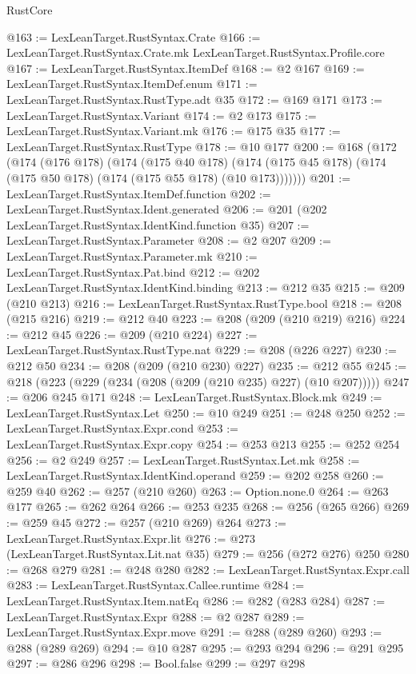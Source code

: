 \begin{lexlean}{RustCore}
\begin{coremodule}
@163 := LexLeanTarget.RustSyntax.Crate
@166 := LexLeanTarget.RustSyntax.Crate.mk LexLeanTarget.RustSyntax.Profile.core
@167 := LexLeanTarget.RustSyntax.ItemDef
@168 := @2 @167
@169 := LexLeanTarget.RustSyntax.ItemDef.enum
@171 := LexLeanTarget.RustSyntax.RustType.adt @35
@172 := @169 @171
@173 := LexLeanTarget.RustSyntax.Variant
@174 := @2 @173
@175 := LexLeanTarget.RustSyntax.Variant.mk
@176 := @175 @35
@177 := LexLeanTarget.RustSyntax.RustType
@178 := @10 @177
@200 := @168
    (@172
      (@174
        (@176 @178)
        (@174
          (@175 @40 @178)
          (@174 (@175 @45 @178) (@174 (@175 @50 @178) (@174 (@175 @55 @178) (@10 @173)))))))
@201 := LexLeanTarget.RustSyntax.ItemDef.function
@202 := LexLeanTarget.RustSyntax.Ident.generated
@206 := @201 (@202 LexLeanTarget.RustSyntax.IdentKind.function @35)
@207 := LexLeanTarget.RustSyntax.Parameter
@208 := @2 @207
@209 := LexLeanTarget.RustSyntax.Parameter.mk
@210 := LexLeanTarget.RustSyntax.Pat.bind
@212 := @202 LexLeanTarget.RustSyntax.IdentKind.binding
@213 := @212 @35
@215 := @209 (@210 @213)
@216 := LexLeanTarget.RustSyntax.RustType.bool
@218 := @208 (@215 @216)
@219 := @212 @40
@223 := @208 (@209 (@210 @219) @216)
@224 := @212 @45
@226 := @209 (@210 @224)
@227 := LexLeanTarget.RustSyntax.RustType.nat
@229 := @208 (@226 @227)
@230 := @212 @50
@234 := @208 (@209 (@210 @230) @227)
@235 := @212 @55
@245 := @218 (@223 (@229 (@234 (@208 (@209 (@210 @235) @227) (@10 @207)))))
@247 := @206 @245 @171
@248 := LexLeanTarget.RustSyntax.Block.mk
@249 := LexLeanTarget.RustSyntax.Let
@250 := @10 @249
@251 := @248 @250
@252 := LexLeanTarget.RustSyntax.Expr.cond
@253 := LexLeanTarget.RustSyntax.Expr.copy
@254 := @253 @213
@255 := @252 @254
@256 := @2 @249
@257 := LexLeanTarget.RustSyntax.Let.mk
@258 := LexLeanTarget.RustSyntax.IdentKind.operand
@259 := @202 @258
@260 := @259 @40
@262 := @257 (@210 @260)
@263 := Option.none.{0}
@264 := @263 @177
@265 := @262 @264
@266 := @253 @235
@268 := @256 (@265 @266)
@269 := @259 @45
@272 := @257 (@210 @269) @264
@273 := LexLeanTarget.RustSyntax.Expr.lit
@276 := @273 (LexLeanTarget.RustSyntax.Lit.nat @35)
@279 := @256 (@272 @276) @250
@280 := @268 @279
@281 := @248 @280
@282 := LexLeanTarget.RustSyntax.Expr.call
@283 := LexLeanTarget.RustSyntax.Callee.runtime
@284 := LexLeanTarget.RustSyntax.Item.natEq
@286 := @282 (@283 @284)
@287 := LexLeanTarget.RustSyntax.Expr
@288 := @2 @287
@289 := LexLeanTarget.RustSyntax.Expr.move
@291 := @288 (@289 @260)
@293 := @288 (@289 @269)
@294 := @10 @287
@295 := @293 @294
@296 := @291 @295
@297 := @286 @296
@298 := Bool.false
@299 := @297 @298

\end{coremodule}
\end{lexlean}
